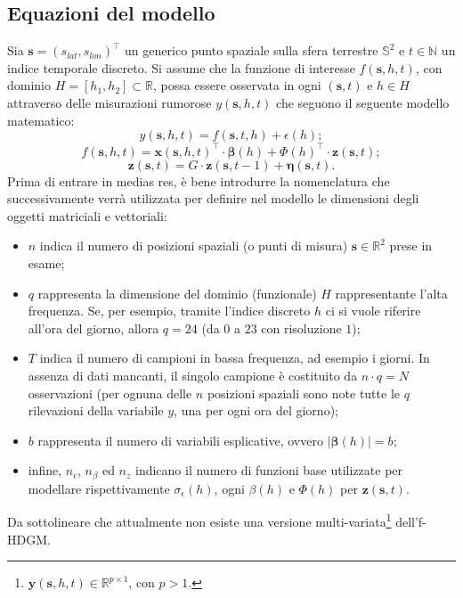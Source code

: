 \subsection[Equazioni del modello]{Equazioni del modello}
Sia $\mathbf{s} = (s_{lat}, s_{lon})^\top$ un generico punto spaziale sulla sfera terrestre $\mathbb{S}^2$ e $t\in\mathbb{N}$ un indice temporale discreto. Si assume che la funzione di interesse $f(\mathbf{s}, h, t)$, con dominio $H=[ h_1, h_2]\subset\mathbb{R}$, possa essere osservata in ogni $(\mathbf{s}, t)$ e $h\in H$ attraverso delle misurazioni rumorose $y(\mathbf{s}, h, t)$ che seguono il seguente modello matematico:
\begin{equation}
	y(\mathbf{s}, h, t) = f(\mathbf{s}, t, h) + \epsilon(h);
	\label{eq_rumore_uscita}
\end{equation}
\begin{equation}
	f(\mathbf{s}, h, t) = \mathbf{x}(\mathbf{s}, h, t)^\top\cdot\boldsymbol{\beta}(h) + \Phi(h)^\top\cdot\mathbf{z}(\mathbf{s}, t);
	\label{eq_comp_det}
\end{equation}
\begin{equation}
	\mathbf{z}(\mathbf{s}, t) = G\cdot \mathbf{z}(\mathbf{s}, t-1) + \boldsymbol{\eta}(\mathbf{s}, t).
	\label{eq_comp_lat}
\end{equation}
Prima di entrare in medias res, è bene introdurre la nomenclatura che successivamente verrà utilizzata per definire nel modello le dimensioni degli oggetti matriciali e vettoriali:
\begin{itemize}
	\item $n$ indica il numero di posizioni spaziali (o punti di misura) $\mathbf{s}\in\mathbb{R}^2$ prese in esame;
	\item $q$ rappresenta la dimensione del dominio (funzionale) $H$ rappresentante l'alta frequenza. Se, per esempio, tramite l'indice discreto $h$ ci si vuole riferire all'ora del giorno, allora $q=24$ (da $0$ a $23$ con risoluzione $1$);
	\item $T$ indica il numero di campioni in bassa frequenza, ad esempio i giorni. In assenza di dati mancanti, il singolo campione è costituito da $n\cdot q = N$ osservazioni (per ognuna delle $n$ posizioni spaziali sono note tutte le $q$ rilevazioni della variabile $y$, una per ogni ora del giorno);
	\item $b$ rappresenta il numero di variabili esplicative, ovvero $|\boldsymbol{\beta}(h)| = b$;
	\item infine, $n_\epsilon$, $n_\beta$ ed $n_z$ indicano il numero di funzioni base utilizzate per modellare rispettivamente $\sigma_\epsilon (h)$, ogni $\beta(h)$ e $\Phi(h)$ per $\mathbf{z}(\mathbf{s}, t)$.
\end{itemize}
Da sottolineare che attualmente non esiste una versione multi-variata\footnote{$\mathbf{y}(\mathbf{s}, h, t)\in\mathbb{R}^{p\times 1}$, con $p>1$.} dell'f-HDGM.

